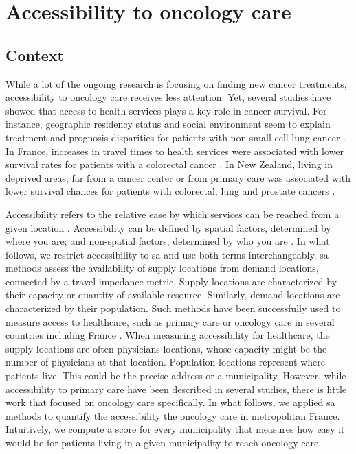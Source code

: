 \chapter{Accessibility to oncology care}

\section{Context}

While a lot of the ongoing research is focusing on finding new cancer
treatments, accessibility to oncology care receives less attention. Yet, several
studies have showed that access to health services plays a key role in cancer
survival. For instance, geographic residency status and social environment seem
to explain treatment and prognosis disparities for patients with non-small cell
lung cancer \cite{johnson_treatment_2014}. In France, increases in travel times
to health services were associated with lower survival rates for patients with a
colorectal cancer \cite{dejardin_influence_2014}. In New Zealand, living in
deprived areas, far from a cancer center or from primary care was associated
with lower survival chances for patients with colorectal, lung and prostate
cancers \cite{haynes_cancer_2008}.

Accessibility refers to the relative ease by which services can be reached from
a given location \cite{wang_measurement_2012}. Accessibility can be defined by
spatial factors, determined by where you are; and non-spatial factors,
determined by who you are \cite{khan_integrated_1992}. In what follows, we
restrict accessibility to \acf{sa} and use both terms interchangeably. \ac{sa}
methods assess the availability of supply locations from demand locations,
connected by a travel impedance metric. Supply locations are characterized by
their capacity or quantity of available resource. Similarly, demand locations
are characterized by their population. Such methods have been successfully used
to measure access to healthcare, such as primary care
\cite{guagliardo_spatial_2004} or oncology care
\cite{wang_measurement_2012,zahnd_spatial_2021,alahmadi_spatial_2013} in several
countries including France
\cite{launay_methodology_2019,gusmano_disparities_2014,gao_assessment_2016}.
When measuring accessibility for healthcare, the supply locations are often
physicians locations, whose capacity might be the number of physicians at that
location. Population locations represent where patients live. This could be
the precise address or a municipality. However, while accessibility to primary
care have been described in several studies, there is little work that focused
on oncology care specifically. In what follows, we applied \ac{sa} methods to
quantify the accessibility the oncology care in metropolitan France.
Intuitively, we compute a score for every municipality that measures how easy
it would be for patients living in a given municipality to reach oncology care.

